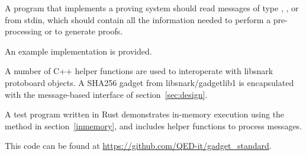 A program that implements a proving system should read messages of type
, , or 
from stdin, which should contain all the information needed to perform a pre-processing or to generate proofs.



An example implementation is provided.

A number of C++ helper functions are used to interoperate
with libsnark protoboard objects.
A SHA256 gadget from libsnark/gadgetlib1
is encapsulated with the message-based interface of section~\ref{sec:design}.

A test program written in Rust demonstrates
in-memory execution using the method in section~\ref{inmemory},
and includes helper functions to process messages.

This code can be found at \href{https://github.com/QED-it/gadget_standard}{https://github.com/QED-it/gadget\_standard}.
